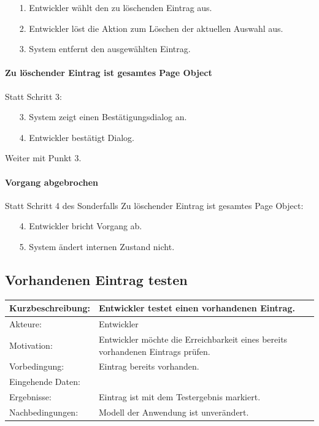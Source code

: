 \begin{itemize}[itemsep=0pt]
\item[1.] Entwickler wählt den zu löschenden Eintrag aus.
\item[2.] Entwickler löst die Aktion zum Löschen der aktuellen Auswahl aus. 
\item[3.] System entfernt den ausgewählten Eintrag.
\end{itemize}

\paragraph{Zu löschender Eintrag ist gesamtes Page Object}
Statt Schritt 3:
\begin{itemize}[itemsep=0pt]
\item[3.] System zeigt einen Bestätigungsdialog an. 
\item[4.] Entwickler bestätigt Dialog. 
\end{itemize}
Weiter mit Punkt 3. 

\paragraph{Vorgang abgebrochen}
Statt Schritt 4 des Sonderfalls \grq Zu löschender Eintrag ist gesamtes Page Object\grq:
\begin{itemize}[itemsep=0pt]
\item[4.] Entwickler bricht Vorgang ab. 
\item[5.] System ändert internen Zustand nicht. 
\end{itemize}

\subsection{Vorhandenen Eintrag testen}
\label{sec:test_entry}

\begin{tabular}[h]{|p{4cm}|p{}|}
\hline 
\rule[-1ex]{0pt}{2.5ex}Kurzbeschreibung: & 
Entwickler testet einen vorhandenen Eintrag. \\  
\hline 
\rule[-1ex]{0pt}{2.5ex}Akteure: & 
Entwickler \\ 
\hline 
\rule[-1ex]{0pt}{2.5ex}Motivation: & 
Entwickler möchte die Erreichbarkeit eines bereits vorhandenen Eintrags prüfen. \\ 
\hline 
\rule[-1ex]{0pt}{2.5ex}Vorbedingung: & 
Eintrag bereits vorhanden. \\ 
\hline 
\rule[-1ex]{0pt}{2.5ex}Eingehende Daten: & \\ 
\hline 
\rule[-1ex]{0pt}{2.5ex}Ergebnisse: & Eintrag ist mit dem Testergebnis markiert. \\ 
\hline 
\rule[-1ex]{0pt}{2.5ex}Nachbedingungen: & Modell der Anwendung ist unverändert.  \\ 
\hline 
\end{tabular} 

